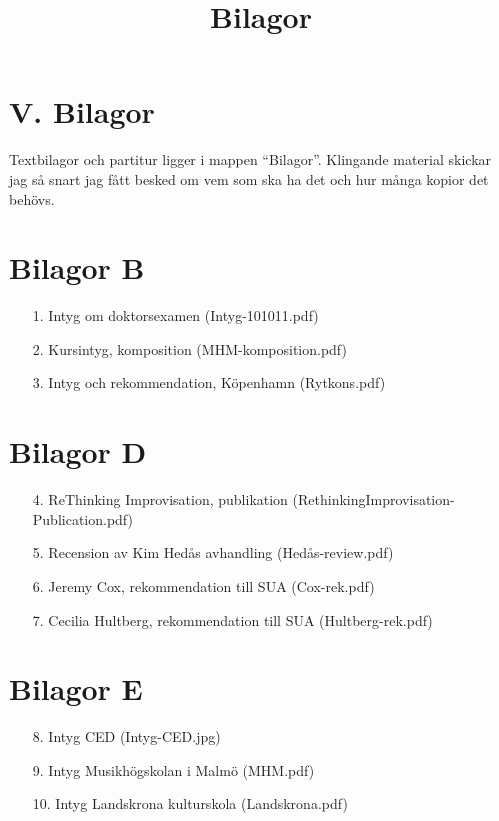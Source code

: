 \documentclass[a4paper]{article}
\title{Bilagor}
\date{}
\begin{document}

\thispagestyle{empty}

\section*{\textsf{V. Bilagor}}


\vspace{2cm}

Textbilagor och partitur ligger i mappen ``Bilagor''. Klingande material skickar jag så snart jag fått besked om vem som ska ha det och hur många kopior det behövs.

\section*{\textsf{Bilagor B}}

\begin{enumerate}
\item[1.] Intyg om doktorsexamen (Intyg-101011.pdf)
\item[2.] Kursintyg, komposition (MHM-komposition.pdf)
\item [3.] Intyg och rekommendation, Köpenhamn (Rytkons.pdf)
\end{enumerate}

\section*{\textsf{Bilagor D}}

\begin{enumerate}
\item [4.] ReThinking Improvisation, publikation (RethinkingImprovisation-Publication.pdf)
\item [5.] Recension av Kim Hedås avhandling (Hedås-review.pdf)
\item [6.] Jeremy Cox, rekommendation till SUA (Cox-rek.pdf)
\item [7.] Cecilia Hultberg, rekommendation till SUA (Hultberg-rek.pdf)
\end{enumerate}

\section*{\textsf{Bilagor E}}

\begin{enumerate}
\item [8.] Intyg CED (Intyg-CED.jpg)
\item [9.] Intyg Musikhögskolan i Malmö (MHM.pdf)
\item [10.] Intyg Landskrona kulturskola (Landskrona.pdf)
\end{enumerate}
\end{document}
